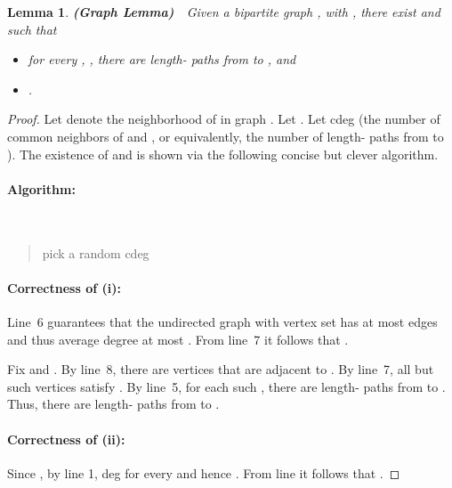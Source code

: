 \documentclass[11pt]{article}
\newtheorem{lemma}[theorem]{Lemma}
\begin{document}
{\begin{lemma} {\bf (Graph Lemma)}\ \ Given a bipartite graph , with , there exist  and  such that

\begin{itemize}
\item[\rm (i)]  for every , , there are  length-
       paths from  to , and
\item[\rm (ii)] .
\end{itemize}
\end{lemma}

\begin{proof}

Let  denote the neighborhood of  in graph .  Let .
Let cdeg
(the number of common neighbors of  and , or equivalently,
the number of length- paths from  to ).
The existence of  and  is shown via the following
concise but clever algorithm.

\paragraph{Algorithm:}
\


\begin{quote}
\begin{algorithmic}[1]

 \State  
 \Repeat
 \State pick a random 
 \State 
 \State  cdeg
 \State 
 \State 
 \end{algorithmic}
\end{quote}

\paragraph{Correctness of (i):}

Line~6 guarantees that the undirected graph  with vertex
set  has
at most  edges and thus average degree at most
.
From line~7 it follows that .

Fix  and .
By line~8, there are  vertices  that are
adjacent to .  By line~7, all but  such vertices  satisfy .
By line~5, for each such , there are  length- paths from  to .
Thus, there are 
length- paths from  to .



\paragraph{Correctness of (ii):}

Since , by line 1, deg for every  and hence .
From line   it follows that .


\end{proof}}
\end{document}
